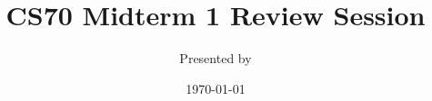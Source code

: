 

\title{CS70 Midterm 1 Review Session}
\author{Presented by }
\date{\today}

\newcommand{\SlideAccessingLogistics}{@\#}





%





